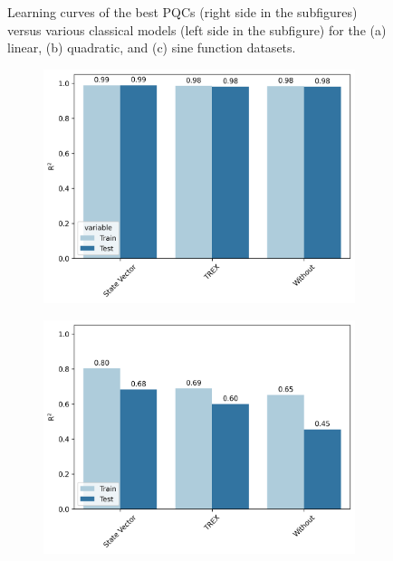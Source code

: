 \documentclass[journal=jacsat,manuscript=article]{achemso}
\begin{document}
\begin{figure}[H]
\begin{subfigure}[b]{0.49\textwidth}
		\caption{}
		\label{fig:sine_learning_curves}
	\end{subfigure}	
	\caption{Learning curves of the best PQCs (right side in the subfigures) versus various classical models (left side in the subfigure) for the (a) linear, (b) quadratic, and (c) sine function datasets.}
	\label{fig:functionfitting_learning_curves}	
\end{figure}




\begin{figure}[H]
	\centering	
	\begin{subfigure}[b]{0.49\textwidth}
		\centering
		\includegraphics[width=\linewidth]{../images/Function_Fitting/linear_error_mitigation.png}
		\caption{}
		\label{fig:linear_error_mitigation}
	\end{subfigure}
	\hfill	
	\begin{subfigure}[b]{0.49\textwidth}
		\centering
		\includegraphics[width=\linewidth]{../images/Function_Fitting/quadratic_error_mitigation.png}

\end{subfigure}
\end{figure}
\end{document}
